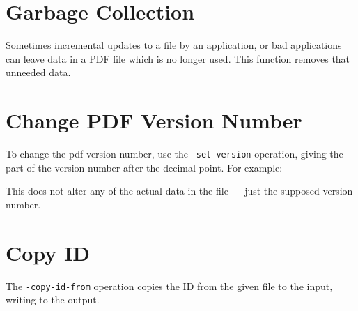 \documentclass{book}
\begin{document}
\noindent{}

  \section{Garbage Collection}
  Sometimes incremental updates to a file by an application, or bad
applications can leave data in a PDF file which is no longer used. This
function removes that unneeded data.

\noindent{}
 
  \section{Change PDF Version Number}
   \label{setversion}
   To change the pdf version number, use the \texttt{-set-version} operation,
giving the part of the version number after the decimal point. For example:

\noindent{}

  \noindent This does not alter any of the actual data in the file ---
just the supposed version number.

  \section{Copy ID}
  The \texttt{-copy-id-from} operation copies the ID from the given file to the
input, writing to the output.

\noindent{}
\end{document}
